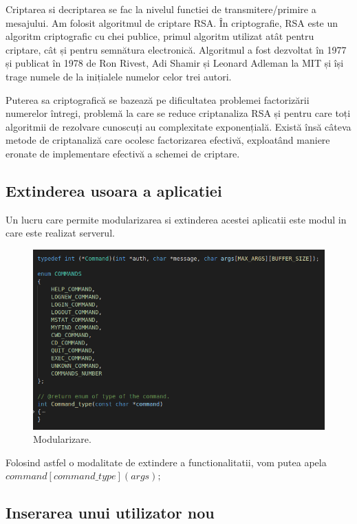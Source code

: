\documentclass[runningheads]{llncs}
\begin{document}
Criptarea si decriptarea se fac la nivelul functiei de transmitere/primire a mesajului.
Am folosit algoritmul de criptare RSA. 
În criptografie, RSA este un algoritm criptografic cu chei publice, primul algoritm utilizat atât pentru criptare, cât și pentru semnătura electronică. Algoritmul a fost dezvoltat în 1977 și publicat în 1978 de Ron Rivest, Adi Shamir și Leonard Adleman la MIT și își trage numele de la inițialele numelor celor trei autori. \cite{ref_rsa}

Puterea sa criptografică se bazează pe dificultatea problemei factorizării numerelor întregi, problemă la care se reduce criptanaliza RSA și pentru care toți algoritmii de rezolvare cunoscuți au complexitate exponențială. Există însă câteva metode de criptanaliză care ocolesc factorizarea efectivă, exploatând maniere eronate de implementare efectivă a schemei de criptare.

\subsection{ Extinderea usoara a aplicatiei}
Un lucru care permite modularizarea si extinderea acestei aplicatii este modul in care este realizat serverul.
\begin{figure}[H]
  \includegraphics[width=\linewidth]{command.png}
  \caption{Modularizare.}
  \label{fig:Modularizare}
\end{figure}

Folosind astfel o modalitate de extindere a functionalitatii, vom putea apela $command[command\_type](args);$


\subsection{ Inserarea unui utilizator nou } 
\end{document}
